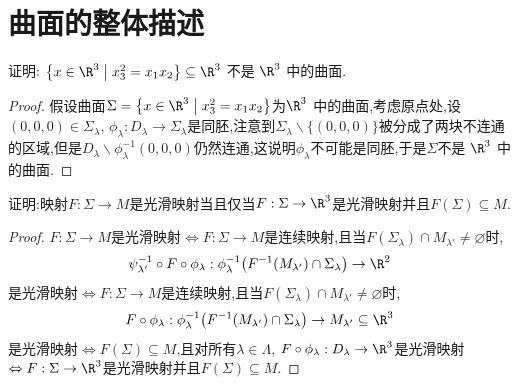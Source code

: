 \section{曲面的整体描述}
\begin{excise}
		证明: $ \left\{x \in \R^3 \bigm| x_3^2=x_1 x_2\right\} \subseteq \R^3$ 不是 $\R^3$ 中的曲面.
	\end{excise}
	\begin{proof}
		假设曲面$\Sigma=\left\{x \in \R^3 \bigm| x_3^2=x_1 x_2\right\}$为$\R^3$ 中的曲面,考虑原点处,设$(0,0,0)\in\Sigma_{\lambda}$, $\phi_{\lambda}:D_{\lambda}\to\Sigma_{\lambda}$是同胚,注意到$\Sigma_{\lambda}\backslash\{(0,0,0)\}$被分成了两块不连通的区域,但是$D_{\lambda}\backslash\phi_{\lambda}^{-1}(0,0,0)$仍然连通,这说明$\phi_{\lambda}$不可能是同胚,于是$\Sigma$不是 $\R^3$ 中的曲面.
	\end{proof}
	\begin{excise}
		证明:映射$F:\Sigma\to M$是光滑映射当且仅当$F:\Sigma\to\R^{3}$是光滑映射并且$F(\Sigma)\subseteq M$.
	\end{excise}
	\begin{proof}
		$F:\Sigma\to M$是光滑映射$\Leftrightarrow F:\Sigma\to M$是连续映射,且当$F(\Sigma_{\lambda})\cap M_{\lambda'}\neq\varnothing$时, 
		$$
		\psi_{\lambda'}^{-1}\circ F\circ \phi_{\lambda}:\phi_{\lambda}^{-1}\bigl(F^{-1}(M_{\lambda'})\cap\Sigma_{\lambda}\bigr)\to\R^{2}
		$$
		是光滑映射$\Leftrightarrow F:\Sigma\to M$是连续映射,且当$F(\Sigma_{\lambda})\cap M_{\lambda'}\neq\varnothing$时, 
		$$
		F\circ \phi_{\lambda}:\phi_{\lambda}^{-1}\bigl(F^{-1}(M_{\lambda'})\cap\Sigma_{\lambda}\bigr)\to M_{\lambda'}\subseteq \R^{3}
		$$
		是光滑映射$\Leftrightarrow F(\Sigma)\subseteq M$,且对所有$\lambda\in\Lambda$, $F\circ \phi_{\lambda}:D_{\lambda}\to \R^{3}$是光滑映射$\Leftrightarrow F:\Sigma\to\R^{3}$是光滑映射并且$F(\Sigma)\subseteq M$.
	\end{proof}
	
